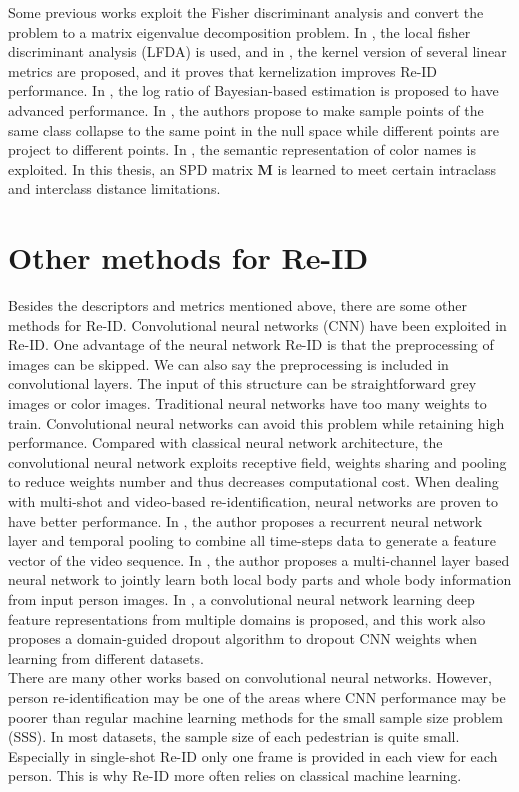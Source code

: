 Some previous works exploit the Fisher discriminant analysis and convert the problem to a matrix eigenvalue decomposition problem. In \cite{LFDA}, the local fisher discriminant analysis (LFDA) is used, and in \cite{KernelVersionMetrics}, the kernel version of several linear metrics are proposed, and it proves that kernelization improves Re-ID performance. In \cite{LOMO}, the log ratio of Bayesian-based estimation is proposed to have advanced performance. In \cite{NFST}, the authors propose to make sample points of the same class collapse to the same point in the null space while different points are project to different points. In \cite{SCNCD}, the semantic representation of color names is exploited. In this thesis, an SPD matrix $\bm{M}$ is learned to meet certain intraclass and interclass distance limitations. 

\section{Other methods for Re-ID}
Besides the descriptors and metrics mentioned above, there are some other methods for Re-ID. Convolutional neural networks (CNN) have been exploited in Re-ID. One advantage of the neural network Re-ID is that the preprocessing of images can be skipped. We can also say the preprocessing is included in convolutional layers. The input of this structure can be straightforward grey images or color images.  Traditional neural networks have too many weights to train. Convolutional neural networks can avoid this problem while retaining high performance. Compared with classical neural network architecture, the convolutional neural network exploits receptive field, weights sharing and pooling to reduce weights number and thus decreases computational cost. When dealing with multi-shot and video-based re-identification, neural networks are proven to have better performance. In \cite{RecurrentCNN}, the author proposes a recurrent neural network layer and temporal pooling to combine all time-steps data to generate a feature vector of the video sequence. In \cite{MultiCNN}, the author proposes a multi-channel layer based neural network to jointly learn both local body parts and whole body information from input person images.  In \cite{DeepfeatureCNN}, a convolutional neural network learning deep feature representations from multiple domains is proposed, and this work also proposes a domain-guided dropout algorithm to dropout CNN weights when learning from different datasets. \\
\indent There are many other works based on convolutional neural networks. However, person re-identification may be one of the areas where CNN performance may be poorer than regular machine learning methods for the small sample size problem (SSS). In most datasets, the sample size of each pedestrian is quite small. Especially in single-shot Re-ID only one frame is provided in each view for each person. This is why Re-ID more often relies on classical machine learning.

